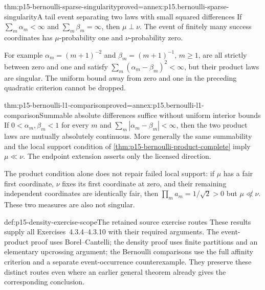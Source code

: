 \begin{hbtheorem}{thm:p15-bernoulli-sparse-singularity}{proved=annex:p15.bernoulli-sparse-singularity}{A tail event separating two laws with small squared differences}
If \(\sum_m\alpha_m<\infty\) and \(\sum_m\beta_m=\infty\), then
\(\mu\perp\nu\). The event of finitely many success coordinates
has \(\mu\)-probability one and \(\nu\)-probability zero.

For example \(\alpha_m=(m+1)^{-2}\) and
\(\beta_m=(m+1)^{-1}\), \(m\geq1\), are all strictly between zero
and one and satisfy \(\sum_m(\alpha_m-\beta_m)^2<\infty\),
but their product laws are singular.
The uniform bound away from zero and one in the preceding quadratic
criterion cannot be dropped.
\end{hbtheorem}

\begin{hbtheorem}{thm:p15-bernoulli-l1-comparison}{proved=annex:p15.bernoulli-l1-comparison}{Summable absolute differences suffice without uniform interior bounds}
If \(0<\alpha_m,\beta_m<1\) for every \(m\) and
\(\sum_m|\alpha_m-\beta_m|<\infty\), then the two product laws
are mutually absolutely continuous.
More generally the same summability and the local support condition
of \cref{thm:p15-bernoulli-product-complete} imply \(\mu\ll\nu\).
The endpoint extension asserts only the licensed direction.

The product condition alone does not repair failed local support:
if \(\mu\) has a fair first coordinate, \(\nu\) fixes its first
coordinate at zero, and their remaining independent coordinates
are identically fair, then \(\prod_ma_m=1/\sqrt2>0\) but
\(\mu\not\ll\nu\). These two measures are also not singular.
\end{hbtheorem}

\begin{proofboundary}{def:p15-density-exercise-scope}{The retained source exercise routes}
These results supply all Exercises~4.3.4--4.3.10 with their required
arguments. The event-product proof uses Borel--Cantelli; the density
proof uses finite partitions and an elementary upcrossing argument;
the Bernoulli comparisons use the full affinity criterion and a
separate event-occurrence counterexample. They preserve these
distinct routes even where an earlier general theorem already gives
the corresponding conclusion.
\end{proofboundary}

